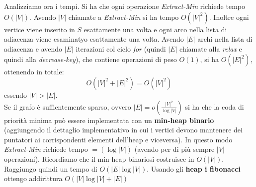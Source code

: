 \documentclass[a4paper,12pt, oneside]{book}
\begin{document}
Analizziamo ora i tempi. Si ha che ogni operazione
\textit{Extract-Min} richiede tempo $O(|V|)$. Avendo $|V|$ chiamate a
\textit{Extract-Min} si ha tempo $O(|V|^2)$. Inoltre ogni vertice
viene inserito in $S$ esattamente una volta e ogni arco nella lista di
adiacenza viene esaminatyo esattamente una volta. Avendo $|E|$ archi
nella lista di adiacenza e avendo $|E|$ iterazioni col ciclo
\textit{for} (quindi $|E|$ chiamate alla \textit{relax} e quindi alla
\textit{decrease-key}), che contiene operazioni di peso $O(1)$, si ha 
$O(|E|^2)$, ottenendo in totale:
\[O(|V|^2+|E|^2)=O(|V|^2)\]
essendo $|V|>|E|$.\\
Se il grafo è suffientemente sparso, ovvero $|E|=o(\frac{|V|^2}{\log
  |V|})$ si ha che la coda di priorità minima può essere implementata
con un \textbf{min-heap binario} (aggiungendo il dettaglio
implementativo in cui i vertici devono mantenere dei puntatori ai
corrispondenti elementi dell'heap e viceversa). In questo modo
\textit{Extract-Min} richiede tempo $=(\log |V|)$ (avendo per di più
sempre $|V|$ operazioni). Ricordiamo che il min-heap binariosi
costruisce in $O(|V|)$. Raggiungo quindi un tempo di $O(|E|\log
|V|)$. Usando gli \textbf{heap i fibonacci} ottengo addirittura
$O(|V|\log |V|+|E|)$
\end{document}
